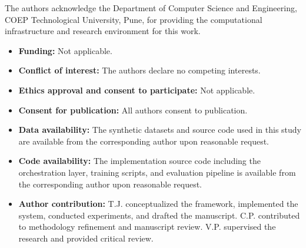 \documentclass[sn-nature]{sn-jnl}
\theoremstyle{thmstyleone}
\theoremstyle{thmstyletwo}
\theoremstyle{thmstylethree}
\begin{document}
\backmatter


The authors acknowledge the Department of Computer Science and Engineering, COEP Technological University, Pune, for providing the computational infrastructure and research environment for this work.


\begin{itemize}
\item \textbf{Funding:} Not applicable.
\item \textbf{Conflict of interest:} The authors declare no competing interests.
\item \textbf{Ethics approval and consent to participate:} Not applicable.
\item \textbf{Consent for publication:} All authors consent to publication.
\item \textbf{Data availability:} The synthetic datasets and source code used in this study are available from the corresponding author upon reasonable request.
\item \textbf{Code availability:} The implementation source code including the orchestration layer, training scripts, and evaluation pipeline is available from the corresponding author upon reasonable request.
\item \textbf{Author contribution:} T.J. conceptualized the framework, implemented the system, conducted experiments, and drafted the manuscript. C.P.
contributed to methodology refinement and manuscript review. V.P. supervised the research and provided critical review.
\end{itemize}



\end{document}
